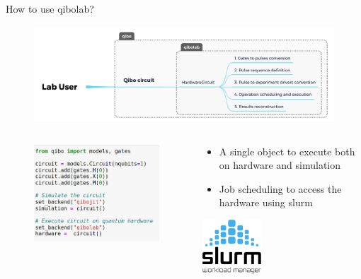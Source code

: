 \documentclass[11p,aspectratio=169]{beamer}
\begin{document}
\begin{frame}{How to use qibolab?}
    \begin{figure}
        \includegraphics[width=\textwidth]{figures/hardwarecircuit.png}
    \end{figure}

    \begin{columns}
        \begin{column}{0.5 \textwidth}
            \begin{figure}
                \includegraphics[width = \columnwidth]{figures/qibo__circuit.png}
            \end{figure}
        \end{column}
        \begin{column}{0.5 \textwidth}
            \begin{itemize}
                \item A single object to execute both on hardware and simulation
                \item Job scheduling to access the hardware using slurm
            \end{itemize}
            \centering
            \includegraphics[height=2cm]{figures/Slurm_logo.svg.png}
        \end{column}
    \end{columns}

\end{frame}
\end{document}
